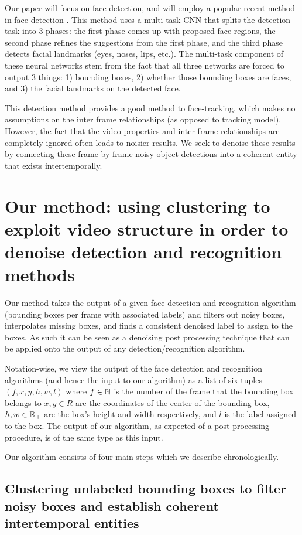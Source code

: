 \documentclass{article}
\begin{document}
Our paper will focus on face detection, and will employ a popular recent
method in face detection \cite{mtcnn}. This method uses a multi-task CNN
that splits the detection task into 3 phases: the first phase comes up with
proposed face regions, the second phase refines the suggestions from the
first phase, and the third phase detects facial landmarks (eyes, noses, lips, etc.).
The multi-task component of these neural networks stem from the fact that
all three networks are forced to output 3 things: 1) bounding boxes, 2) whether
those bounding boxes are faces, and 3) the facial landmarks on the detected
face.

This detection method provides a good method to face-tracking, which makes no assumptions on
the inter frame relationships (as opposed to tracking model). However, the fact that the video properties and inter frame relationships 
are completely ignored often leads to noisier results. We seek to denoise these results by connecting these frame-by-frame noisy object detections into 
a coherent entity that exists intertemporally.

\section{Our method: using clustering to exploit video structure in order to denoise detection and recognition methods}

Our method takes the output of a given face detection and recognition algorithm (bounding boxes per frame with associated labels) and filters out noisy 
boxes, interpolates missing boxes, and finds a consistent denoised label to assign to the boxes. As such it can be seen as a denoising post processing technique that 
can be applied onto the output of any detection/recognition algorithm.

Notation-wise, we view the output of the face detection and recognition
algorithms (and hence the input to our algorithm) as a list of six tuples $(f, x, y, h, w, l)$ where $f \in \operatorname{\mathbb{N}}$ is the number of the frame that the
bounding box belongs to $x, y \in R$ are the coordinates of the
center of the bounding box, $h, w \in \operatorname{\mathbb{R}}_+$ are the box's height and width respectively, and $l$ is the label assigned to the box. The output of our
algorithm, as expected of a post processing procedure, is of the same type as this input.

Our algorithm consists of four main steps which we describe chronologically.

\subsection{Clustering unlabeled bounding boxes to filter noisy boxes and establish coherent intertemporal entities}
\end{document}
